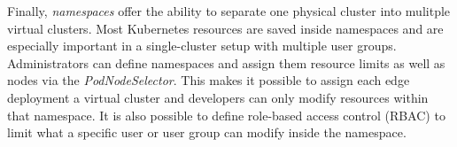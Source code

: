Finally, \textit{namespaces} offer the ability to separate one physical cluster into mulitple virtual clusters. Most Kubernetes resources are saved inside namespaces and are especially important in a single-cluster setup with multiple user groups. Administrators can define namespaces and assign them resource limits as well as nodes via the \textit{PodNodeSelector}. This makes it possible to assign each edge deployment a virtual cluster and developers can only modify resources within that namespace. It is also possible to define role-based access control (RBAC) to limit what a specific user or user group can modify inside the namespace. 
